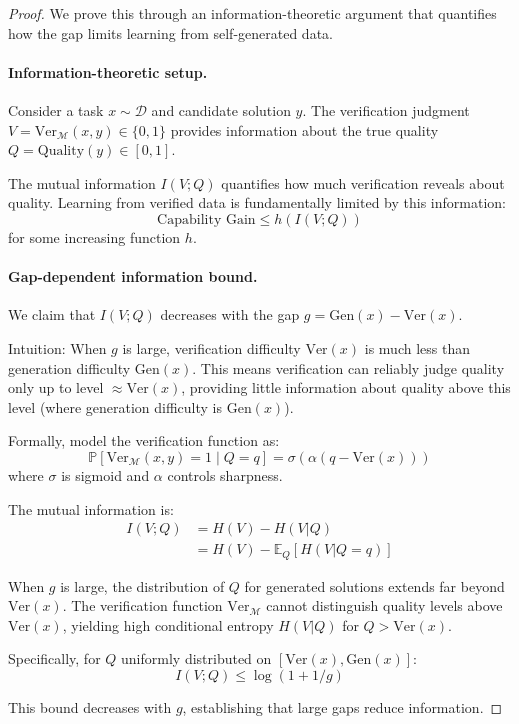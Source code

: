 \documentclass{article}
\theoremstyle{definition}
\theoremstyle{remark}
\newcommand{\M}{\mathcal{M}}
\newcommand{\D}{\mathcal{D}}
\newcommand{\Gen}{\text{Gen}}
\newcommand{\Ver}{\text{Ver}}
\newcommand{\E}{\mathbb{E}}
\newcommand{\Prob}{\mathbb{P}}
\begin{document}
\begin{proof}
We prove this through an information-theoretic argument that quantifies how the gap limits learning from self-generated data.

\paragraph{Information-theoretic setup.}
Consider a task \(x \sim \D\) and candidate solution \(y\). The verification judgment \(V = \Ver_\M(x,y) \in \{0,1\}\) provides information about the true quality \(Q = \text{Quality}(y) \in [0,1]\).

The mutual information \(I(V; Q)\) quantifies how much verification reveals about quality. Learning from verified data is fundamentally limited by this information:
\[
\text{Capability Gain} \leq h(I(V; Q))
\]
for some increasing function \(h\).

\paragraph{Gap-dependent information bound.}
We claim that \(I(V; Q)\) decreases with the gap \(g = \Gen(x) - \Ver(x)\).

Intuition: When \(g\) is large, verification difficulty \(\Ver(x)\) is much less than generation difficulty \(\Gen(x)\). This means verification can reliably judge quality only up to level \(\approx \Ver(x)\), providing little information about quality above this level (where generation difficulty is \(\Gen(x)\)).

Formally, model the verification function as:
\[
\Prob[\Ver_\M(x,y) = 1 \mid Q = q] = \sigma(\alpha(q - \Ver(x)))
\]
where \(\sigma\) is sigmoid and \(\alpha\) controls sharpness.

The mutual information is:
\begin{align*}
I(V; Q) &= H(V) - H(V|Q) \\
&= H(V) - \E_Q[H(V|Q=q)]
\end{align*}

When \(g\) is large, the distribution of \(Q\) for generated solutions extends far beyond \(\Ver(x)\). The verification function \(\Ver_\M\) cannot distinguish quality levels above \(\Ver(x)\), yielding high conditional entropy \(H(V|Q)\) for \(Q > \Ver(x)\).

Specifically, for \(Q\) uniformly distributed on \([\Ver(x), \Gen(x)]\):
\[
I(V; Q) \leq \log(1 + 1/g)
\]

This bound decreases with \(g\), establishing that large gaps reduce information.


\end{proof}
\end{document}
